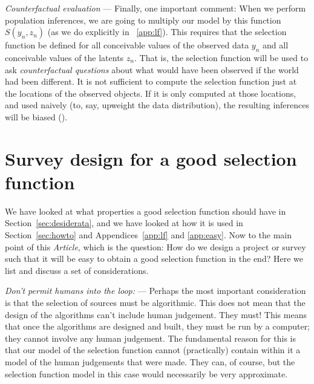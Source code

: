 \documentclass[modern]{aastex62}
\newcommand{\documentname}{\textsl{Article}}
\newcommand{\sectionname}{Section}
\newcommand{\appendixnames}{Appendices}
\renewcommand{\paragraph}[1]{\medskip\noindent\textit{#1} ---}
\begin{document}
\paragraph{Counterfactual evaluation}
Finally, one important comment: When we perform population inferences,
we are going to multiply our model by this function $S(y_n, z_n)$ (as
we do explicitly in \appendixname~\ref{app:lf}).
This requires that the selection function be defined for all
conceivable values of the observed data $y_n$ and all conceivable
values of the latents $z_n$.
That is, the selection function will be used to ask
\emph{counterfactual questions} about what would have been observed if
the world had been different.
It is not sufficient to compute the selection function just at the
locations of the observed objects.
If it is only computed at those locations, and used naively (to, say,
upweight the data distribution), the resulting inferences will be 
biased (\citealt{blogpost}).

\section{Survey design for a good selection function}\label{sec:design}

We have looked at what properties a good selection function should
have in \sectionname~\ref{sec:desiderata}, and we have looked at how
it is used in \sectionname~\ref{sec:howto}
and \appendixnames~\ref{app:lf} and \ref{app:easy}.
Now to the main point of this \documentname, which is the question:
How do we design a project or survey such that it will be easy
to obtain a good selection function in the end?
Here we list and discuss a set of considerations.

\paragraph{Don't permit humans into the loop:}
Perhaps the most important consideration is that the selection of sources
must be algorithmic.
This does not mean that the design of the algorithms can't include
human judgement. They must!
This means that once the algorithms are designed and built, they must
be run by a computer; they cannot involve any human judgement.
The fundamental reason for this is that our model of the selection
function cannot (practically) contain within it a model of the human
judgements that were made.
They can, of course, but the selection function model in this case
would necessarily be very approximate.
\end{document}
